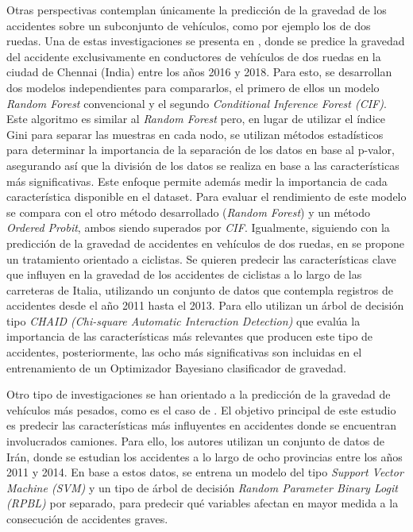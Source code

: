 \documentclass{uathesis-es}
\begin{document}
	Otras perspectivas contemplan únicamente la predicción de la gravedad de los accidentes sobre un subconjunto de vehículos, como por ejemplo los de dos ruedas. Una de estas investigaciones se presenta en \cite{panicker2022injury}, donde se predice la gravedad del accidente exclusivamente en conductores de vehículos de dos ruedas en la ciudad de Chennai (India) entre los años 2016 y 2018. Para esto, se desarrollan dos modelos independientes para compararlos, el primero de ellos un modelo \textit{Random Forest} convencional y  el segundo \textit{Conditional Inference Forest (CIF)}. Este algoritmo es similar al \textit{Random Forest} pero, en lugar de utilizar el índice Gini para separar las muestras en cada nodo, se utilizan métodos estadísticos para determinar la importancia de la separación de los datos en base al p-valor, asegurando así que la división de los datos se realiza en base a las características más significativas. Este enfoque permite además medir la importancia de cada característica disponible en el dataset. Para evaluar el rendimiento de este modelo se compara con el otro método desarrollado (\textit{Random Forest}) y un método \textit{Ordered Probit}, ambos siendo superados por \textit{CIF}. Igualmente, siguiendo con la predicción de la gravedad de accidentes en vehículos de dos ruedas, en \cite{prati2017using} se propone un tratamiento orientado a ciclistas. Se quieren predecir las características clave que influyen en la gravedad de los accidentes de ciclistas a lo largo de las carreteras de Italia, utilizando un conjunto de datos que contempla registros de accidentes desde el año 2011 hasta el 2013. Para ello utilizan un árbol de decisión tipo \textit{CHAID (Chi-square Automatic Interaction Detection)} que evalúa la importancia de las características más relevantes que producen este tipo de accidentes, posteriormente, las ocho más significativas son incluidas en el entrenamiento de un Optimizador Bayesiano clasificador de gravedad.
	
	Otro tipo de investigaciones se han orientado a la predicción de la gravedad de vehículos más pesados, como es el caso de \cite{hosseinzadeh2021investigating}. El objetivo principal de este estudio es predecir las características más influyentes en accidentes donde se encuentran involucrados camiones. Para ello, los autores utilizan un conjunto de datos de Irán, donde se estudian los accidentes a lo largo de ocho provincias entre los años 2011 y 2014. En base a estos datos, se entrena un modelo del tipo \textit{Support Vector Machine (SVM)} y un tipo de árbol de decisión \textit{Random Parameter Binary Logit (RPBL)} por separado, para predecir qué variables afectan en mayor medida a la consecución de accidentes graves. 
	
\end{document}

